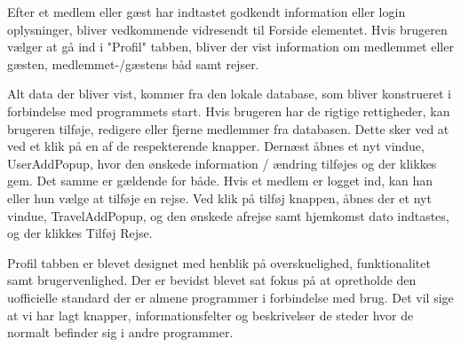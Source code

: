 Efter et medlem eller gæst har indtastet godkendt information eller login oplysninger, bliver vedkommende vidresendt til Forside elementet. Hvis brugeren vælger at gå ind i "Profil" tabben, bliver der vist information om medlemmet eller gæsten, medlemmet-/gæstens båd samt rejser. 

Alt data der bliver vist, kommer fra den lokale database, som bliver konstrueret i forbindelse med programmets start.
Hvis brugeren har de rigtige rettigheder, kan brugeren tilføje, redigere eller fjerne medlemmer fra databasen. Dette sker ved at ved et klik på en af de respekterende knapper. Dernæst åbnes et nyt vindue, UserAddPopup, hvor den ønskede information / ændring tilføjes og der klikkes gem. Det samme er gældende for både.
Hvis et medlem er logget ind, kan han eller hun vælge at tilføje en rejse. Ved klik på tilføj knappen, åbnes der et nyt vindue, TravelAddPopup, og den ønskede afrejse samt hjemkomst dato indtastes, og der klikkes Tilføj Rejse. 

Profil tabben er blevet designet med henblik på overskuelighed, funktionalitet samt brugervenlighed. Der er bevidst blevet sat fokus på at opretholde den uofficielle standard der er almene programmer i forbindelse med brug. Det vil sige at vi har lagt knapper, informationsfelter og beskrivelser de steder hvor de normalt befinder sig i andre programmer.